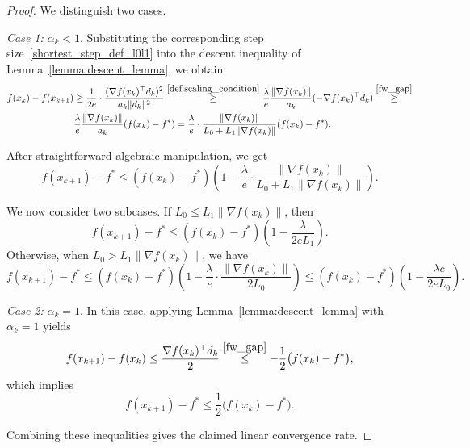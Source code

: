 \documentclass[runningheads]{llncs}
\begin{document}
	\begin{proof}
		We distinguish two cases.
		
		\textit{Case 1:} $\alpha_k < 1$.  
		Substituting the corresponding step size~\eqref{shortest_step_def_l0l1} into the descent inequality of Lemma~\ref{lemma:descent_lemma}, we obtain
		\begin{equation*}
			\begin{split}
				f(x_k) - f(x_{k+1})
				&\geq \frac{1}{2e}
				\cdot \frac{(\nabla f(x_k)^\top d_k)^2}{a_k \|d_k\|^2}
				\overset{\eqref{def:scaling_condition}}{\geq}
				\frac{\lambda}{e} \frac{\| \nabla f(x_k) \|}{a_k} (- \nabla f(x_k)^\top d_k)
				\overset{\eqref{fw_gap}}{\geq} \\
				&\frac{\lambda}{e} \frac{ \| \nabla f(x_k) \|}{a_k} (f(x_k) - f^*)
				= \frac{\lambda}{e} \cdot \frac{\| \nabla f(x_k) \|}{L_0 + L_1 \| \nabla f(x_k) \|} (f(x_k) - f^*).
			\end{split}
		\end{equation*}
		
		After straightforward algebraic manipulation, we get
		\begin{equation*}
			f(x_{k+1}) - f^* 
			\leq (f(x_k) - f^*) 
			\left( 1 - \frac{\lambda}{e} \cdot \frac{\| \nabla f(x_k) \|}{L_0 + L_1 \| \nabla f(x_k) \|} \right).
		\end{equation*}
		
		We now consider two subcases.  
		If $L_0 \leq L_1 \| \nabla f(x_k) \|$, then
		\begin{equation*}
			f(x_{k+1}) - f^*
			\leq (f(x_k) - f^*) 
			\left( 1 - \frac{\lambda}{2 e L_1} \right).
		\end{equation*}
		Otherwise, when $L_0 > L_1 \| \nabla f(x_k) \|$, we have
		\begin{equation*}
			f(x_{k+1}) - f^*
			\leq (f(x_k) - f^*) 
			\left( 1 - \frac{\lambda}{e} \cdot \frac{\| \nabla f(x_k) \|}{2 L_0} \right)
			\leq (f(x_k) - f^*)
			\left( 1 - \frac{\lambda c}{2 e L_0} \right).
		\end{equation*}
		
		\textit{Case 2:} $\alpha_k = 1$.  
		In this case, applying Lemma~\ref{lemma:descent_lemma} with $\alpha_k = 1$ yields
		\begin{equation*}
			f(x_{k+1}) - f(x_k)
			\leq \frac{\nabla f(x_k)^\top d_k}{2}
			\overset{\eqref{fw_gap}}{\leq}
			-\frac{1}{2}\bigl(f(x_k) - f^*\bigr),
		\end{equation*}
		which implies
		\begin{equation*}
			f(x_{k+1}) - f^*
			\leq \frac{1}{2}\bigl(f(x_k) - f^*\bigr).
		\end{equation*}
		
		Combining these inequalities gives the claimed linear convergence rate.
	\end{proof}
	
\end{document}
